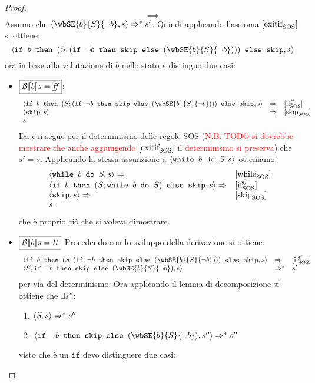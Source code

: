 {\begin{enumerate}
\begin{proof}
$$
\boxed{\implies}
$$
Assumo che $\confSs{\wbSE{b}{S}{\neg b}}{s} \Rar{*} s'$.
Quindi applicando l'assioma $[ \textrm{\normalfont{exitif}} ^ \textrm{\normalfont{}} _\textrm{\normalfont{SOS}} ]$ si ottiene:
$$
\confSs{\ifABC{b}{(S; (\ifABC{\neg b}{\skipForFriends}{(\wbSE{b}{S}{\neg b})}))}{\skipForFriends}}{s}
$$
ora in base alla valutazione di $b$ nello stato $s$ distinguo due casi:
\begin{itemize}
	\item $\boxed{\mathcal{B} \llbracket b \rrbracket s = \mbox{\textit{ff}}}$:
	$$
	\begin{array}{lll}
	\confSs{\ifABC{b}{(S; (\ifABC{\neg b}{\skipForFriends}{(\wbSE{b}{S}{\neg b})}))}{\skipForFriends}}{s} & \Rar{} & \ifffSOS \\
	\confSs{\skipForFriends}{s} & \Rar{}& \skipSOS \\
	s
	\end{array}
	$$
	Da cui segue per il determinismo delle regole SOS (\textcolor{red}{N.B. TODO si dovrebbe mostrare che anche aggiungendo
	$[ \textrm{\normalfont{exitif}} ^ \textrm{\normalfont{}} _\textrm{\normalfont{SOS}} ]$ il determinismo si preserva}) che $s' = s$.
	Applicando la stessa assunzione a $\langle{}\mbox{\normalfont{\texttt{while }}} b \textrm{\normalfont{\texttt{ do }}} S, s\rangle{}$ otteniamo:
	$$
	\begin{array}{ll}
	\langle{}\mbox{\normalfont{\texttt{while }}} b \textrm{\normalfont{\texttt{ do }}} S, s\rangle{} \Rightarrow^{}& [ \textrm{\normalfont{while}} ^ \textrm{\normalfont{}} _\textrm{\normalfont{SOS}} ] \\
	\langle{}\mbox{\normalfont{\texttt{if }}} b \textrm{\normalfont{\texttt{ then }}} (S; \mbox{\normalfont{\texttt{while }}} b \textrm{\normalfont{\texttt{ do }}} S) \textrm{\normalfont{\texttt{ else }}} \textrm{\normalfont{\texttt{skip}}}, s\rangle{} \Rightarrow^{} & [ \textrm{\normalfont{if}} ^ \textrm{\normalfont{\ensuremath{\mbox{\textit{ff}}}}} _\textrm{\normalfont{SOS}} ] \\ 
	\langle{}\textrm{\normalfont{\texttt{skip}}}, s\rangle{} \Rightarrow^{}& [ \textrm{\normalfont{skip}} ^ \textrm{\normalfont{}} _\textrm{\normalfont{SOS}} ] \\
	s
	\end{array}
	$$
	che è proprio ciò che si voleva dimostrare.
	\item $\boxed{\mathcal{B} \llbracket b \rrbracket s = \mbox{\textit{tt}}}$
	Procedendo con lo sviluppo della derivazione si ottiene:
	$$
	\begin{array}{lll}
	\confSs{\ifABC{b}{(S; (\ifABC{\neg b}{\skipForFriends}{(\wbSE{b}{S}{\neg b})}))}{\skipForFriends}}{s} & \Rar{} & \ifffSOS \\
	\confSs{S; \ifABC{\neg b}{\skipForFriends}{(\wbSE{b}{S}{\neg b})}}{s} & \Rar{*} & s'\\
	\end{array}
	$$
	per via del determinismo.
	Ora applicando il lemma di decomposizione si ottiene che $\exists s''$:
	\begin{enumerate}
	\item $\langle{}S, s\rangle{} \Rightarrow^{*} s''$
	\label{hw6:Ssgoestos''}
	\item $\confSs{\ifABC{\neg b}{\skipForFriends}{(\wbSE{b}{S}{\neg b})}}{s''} \Rar{*} s''$
	\label{hw6:ifnegb}
	\end{enumerate}
	visto che è un $\texttt{if}$ devo distinguere due casi:

\end{itemize}
\end{proof}
\end{enumerate}}
